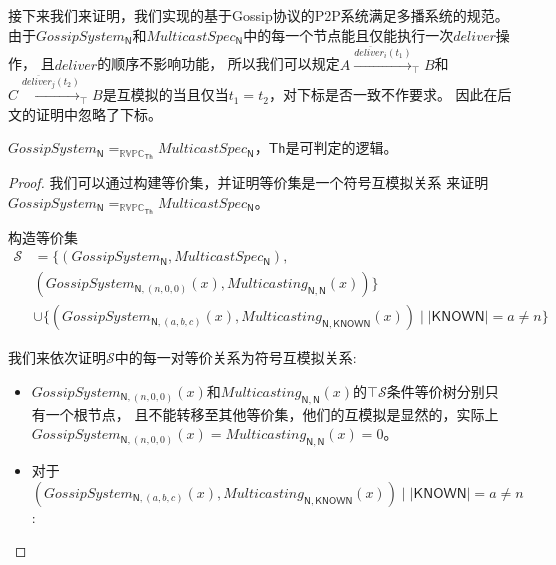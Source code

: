  接下来我们来证明，我们实现的基于Gossip协议的P2P系统满足多播系统的规范。
 由于$GossipSystem_{\mathsf{N}}$和$MulticastSpec_\mathsf{N}$中的每一个节点能且仅能执行一次$deliver$操作，
 且$deliver$的顺序不影响功能，
所以我们可以规定$A\stackrel{\overline{deliver_i}(t_1)}{\longrightarrow}_{\top} B$和$C\stackrel{\overline{deliver_j}(t_2)}{\longrightarrow}_{\top}B$是互模拟的当且仅当$t_1=t_2$，对下标是否一致不作要求。
因此在后文的证明中忽略了下标。
\begin{theorem}
    $GossipSystem_{\mathsf{N}} =_{\mathbb{RVPC}_{\mathsf{Th}}} MulticastSpec_{\mathsf{N}}$，$\mathsf{Th}$是可判定的逻辑。
\end{theorem}
\begin{proof}

我们可以通过构建等价集，并证明等价集是一个符号互模拟关系
来证明$GossipSystem_{\mathsf{N}} =_{\mathbb{RVPC}_{\mathsf{Th}}} MulticastSpec_{\mathsf{N}}$。

构造等价集
\begin{align*}
   \mathcal{S}&=\{(GossipSystem_{\mathsf{N}}, MulticastSpec_{\mathsf{N}}), \\
      &(GossipSystem_{\mathsf{N},(n,0,0)}(x), Multicasting_{\mathsf{N},\mathsf{N}}(x))\}\\
      & \cup \{(GossipSystem_{\mathsf{N},(a,b,c)}(x), Multicasting_{\mathsf{N}, \mathsf{KNOWN}}(x))\mid |\mathsf{KNOWN}| = a\neq n\}
\end{align*}

我们来依次证明$\mathcal{S}$中的每一对等价关系为符号互模拟关系:
\begin{itemize}
    \item {
       $GossipSystem_{\mathsf{N},(n,0,0)}(x)$和$Multicasting_{\mathsf{N},\mathsf{N}}(x)$的$\top \mathcal{S}$条件等价树分别只有一个根节点，
       且不能转移至其他等价集，他们的互模拟是显然的，实际上$GossipSystem_{\mathsf{N},(n,0,0)}(x)=Multicasting_{\mathsf{N},\mathsf{N}}(x)=0$。
    }
    \item {
        对于$(GossipSystem_{\mathsf{N},(a,b,c)}(x), Multicasting_{\mathsf{N}, \mathsf{KNOWN}}(x))\mid |\mathsf{KNOWN}| = a\neq n$:

}
\end{itemize}
\end{proof}
